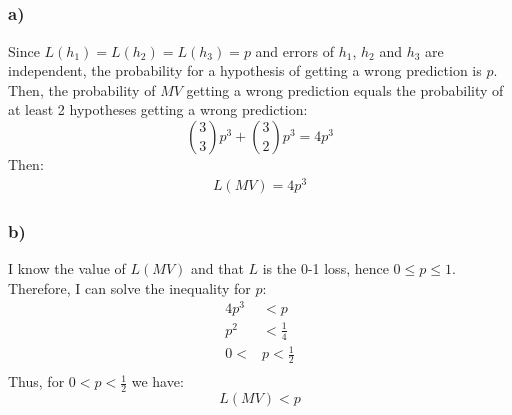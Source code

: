 \documentclass[a4paper]{article}
\begin{document}
\subsection{}
\label{subsec:23}
\subsubsection*{a)}
Since $L(h_1) = L(h_2) = L(h_3) = p$ and errors of $h_1$, $h_2$ and $h_3$ are
independent, the probability for a hypothesis of getting a wrong prediction is
$p$. Then, the probability of $MV$ getting a wrong prediction equals the
probability of at least 2 hypotheses getting a wrong prediction:
\[
\binom{3}{3}p^3 + \binom{3}{2}p^3 = 4p^3
\]
Then:
\begin{align*}
  L(MV) = 4p^3
\end{align*}

\subsubsection*{b)}
I know the value of $L(MV)$ and that $L$ is the 0-1 loss, hence
$0 \leq p \leq  1$.
Therefore, I can solve the inequality for $p$:
\begin{align*}
  4p^3 &< p\\
  p^2 &< \frac{1}{4}\\
  0 < &p < \frac{1}{2}\\
\end{align*}
Thus, for $0 < p < \frac{1}{2}$ we have:
\[
L(MV) < p
\]
\end{document}
